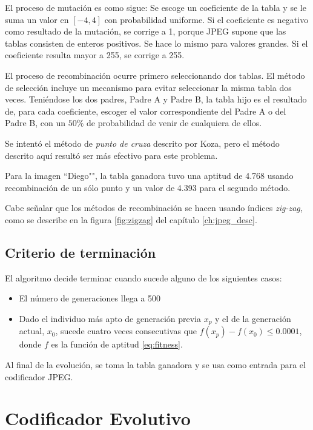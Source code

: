 El proceso de mutación es como sigue: Se escoge un coeficiente de la tabla y se
le suma un valor en $[-4, 4]$ con probabilidad uniforme. Si el coeficiente es
negativo como resultado de la mutación, se corrige a 1, porque JPEG supone que
las tablas consisten de enteros positivos. Se hace lo mismo para valores
grandes. Si el coeficiente resulta mayor a 255, se corrige a 255.

El proceso de recombinación ocurre primero seleccionando dos tablas. El método
de selección incluye un mecanismo para evitar seleccionar la misma tabla dos
veces. Teniéndose los dos padres, Padre A y Padre B, la tabla hijo es el
resultado de, para cada coeficiente, escoger el valor correspondiente del Padre
A o del Padre B, con un $50\%$ de probabilidad de venir de cualquiera de ellos.

Se intentó el método de \emph{punto de cruza} descrito por Koza, pero el método
descrito aquí resultó ser más efectivo para este problema.

Para la imagen ``Diego"", la tabla ganadora tuvo una aptitud de 4.768 usando
recombinación de un sólo punto y un valor de 4.393 para el segundo método.

Cabe señalar que los métodos de recombinación se hacen usando índices
\emph{zig-zag}, como se describe en la figura \ref{fig:zigzag} del capítulo
\ref{ch:jpeg_desc}.



\subsection { Criterio de terminación }

El algoritmo decide terminar cuando sucede alguno de los siguientes casos:

\begin{itemize}
\item El número de generaciones llega a 500
\item Dado el individuo más apto de generación previa $x_p$ y el de la generación actual, $x_0$, sucede cuatro veces consecutivas que $f(x_p) - f(x_0) \leq 0.0001$, donde $f$ es la función de aptitud \ref{eq:fitness}.
\end{itemize}

Al final de la evolución, se toma la tabla ganadora y se usa como entrada para
el codificador \gls{JPEG}.

\section{Codificador Evolutivo}

